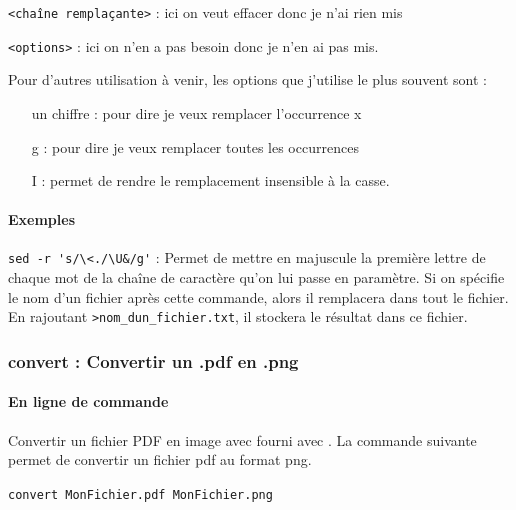 \documentclass[a4paper,twoside]{article}
\begin{document}

{\blue \verb|<chaîne remplaçante>|} : ici on veut effacer donc je n'ai rien mis

{\blue \verb|<options>|} : ici on n'en a pas besoin donc je n'en ai pas mis.

Pour d'autres utilisation à  venir, les options que j'utilise le plus souvent sont :

\begin{itemize}
\item[un chiffre] : pour dire je veux remplacer l'occurrence x
\item[g] : pour dire je veux remplacer toutes les occurrences
\item[I] : permet de rendre le remplacement insensible à la casse.
\end{itemize}

\paragraph{Exemples}

\verb|sed -r 's/\<./\U&/g'| : Permet de mettre en majuscule la première lettre de chaque mot de la chaîne de caractère qu'on lui passe en paramètre. Si on spécifie le nom d'un fichier après cette commande, alors il remplacera dans tout le fichier. En rajoutant \verb|>nom_dun_fichier.txt|, il stockera le résultat dans ce fichier.



\subsubsection{convert : Convertir un .pdf en .png}
\paragraph{En ligne de commande}
Convertir un fichier PDF en image avec    fourni avec . La commande suivante permet de convertir un fichier pdf au format png.

\verb|convert MonFichier.pdf MonFichier.png|
\end{document}
